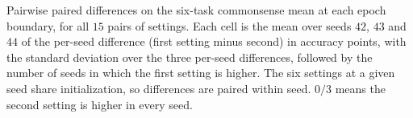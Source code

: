 
\begin{table}[t]
\centering
\caption{Pairwise paired differences on the six-task commonsense mean at each epoch boundary, for all $15$ pairs of settings. Each cell is the mean over seeds $42$, $43$ and $44$ of the per-seed difference (first setting minus second) in accuracy points, with the standard deviation over the three per-seed differences, followed by the number of seeds in which the first setting is higher. The six settings at a given seed share initialization, so differences are paired within seed. $0/3$ means the second setting is higher in every seed.}
\label{tab:pairwise-mean6}
\footnotesize
\setlength{\tabcolsep}{3.5pt}
\renewcommand{\arraystretch}{1.15}


\end{table}
